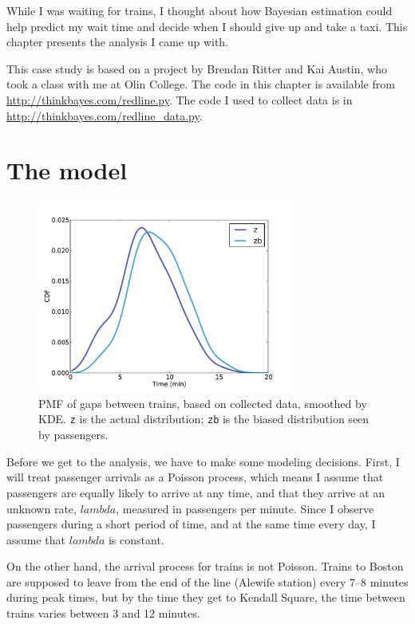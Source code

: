 \documentclass[12pt]{book}
\begin{document}
While I was waiting for trains, I thought about how Bayesian
estimation could help predict my wait time and decide when I
should give up and take a taxi.  This chapter presents the
analysis I came up with.

This case study is based on a project by Brendan Ritter and
Kai Austin, who took a class with me at Olin College.
The code in this chapter is available from
\url{http://thinkbayes.com/redline.py}.  The code I used
to collect data is in \url{http://thinkbayes.com/redline_data.py}.


\section{The model}

\begin{figure}
\centerline{\includegraphics[height=2.5in]{figs/redline0.pdf}}
\caption{PMF of gaps between trains, based on collected data,
smoothed by KDE.  {\tt z} is the actual distribution; {\tt zb}
is the biased distribution seen by passengers. }
\label{fig.redline0}
\end{figure}

Before we get to the analysis, we have to make some
modeling decisions.  First, I will treat passenger arrivals as
a Poisson process, which means I assume that passengers are equally
likely to arrive at any time, and that they arrive at an unknown
rate, $lambda$, measured in passengers per minute.  Since I
observe passengers during a short period of time, and at the same
time every day, I assume that $lambda$ is constant.

On the other hand, the arrival process for trains is not Poisson.
Trains to Boston are supposed to leave from the end of the line
(Alewife station) every 7--8 minutes during peak times, but by the time
they get to Kendall Square, the time between trains varies between 3
and 12 minutes.
\end{document}
